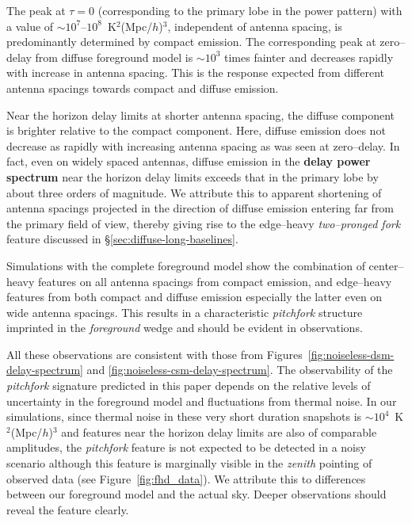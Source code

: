 \documentclass[preprint2,iop,numberedappendix]{emulateapj}
\begin{document}
The peak at $\tau=0$ (corresponding to the primary lobe in the power pattern) with a value of $\sim 10^7$--$10^8$~K$^2$(Mpc/$h$)$^3$, independent of antenna spacing, is predominantly determined by compact emission. The corresponding peak at zero--delay from diffuse foreground model is $\sim 10^3$ times fainter and decreases rapidly with increase in antenna spacing. This is the response expected from different antenna spacings towards compact and diffuse emission. 

Near the horizon delay limits at shorter antenna spacing, the diffuse component is brighter relative to the compact component. Here, diffuse emission does not decrease as rapidly with increasing antenna spacing as was seen at zero--delay. In fact, even on widely spaced antennas, diffuse emission in the {\bf delay power spectrum} near the horizon delay limits exceeds that in the primary lobe by about three orders of magnitude. We attribute this to apparent shortening of antenna spacings projected in the direction of diffuse emission entering far from the primary field of view, thereby giving rise to the edge--heavy {\it two--pronged fork} feature discussed in \S\ref{sec:diffuse-long-baselines}.

Simulations with the complete foreground model show the combination of center--heavy features on all antenna spacings from compact emission, and edge--heavy features from both compact and diffuse emission especially the latter even on wide antenna spacings.  This results in a characteristic {\it pitchfork} structure imprinted in the {\it foreground} wedge and should be evident in observations.

All these observations are consistent with those from Figures~\ref{fig:noiseless-dsm-delay-spectrum} and \ref{fig:noiseless-csm-delay-spectrum}. The observability of the {\it pitchfork} signature predicted in this paper depends on the relative levels of uncertainty in the foreground model and fluctuations from thermal noise. In our simulations, since thermal noise in these very short duration snapshots is $\sim 10^4$~K$^2$(Mpc/$h$)$^3$ and features near the horizon delay limits are also of comparable amplitudes, the {\it pitchfork} feature is not expected to be detected in a noisy scenario although this feature is marginally visible in the {\it zenith} pointing of observed data (see Figure~\ref{fig:fhd_data}). We attribute this to differences between our foreground model and the actual sky.  Deeper observations should reveal the feature clearly.
\end{document}
